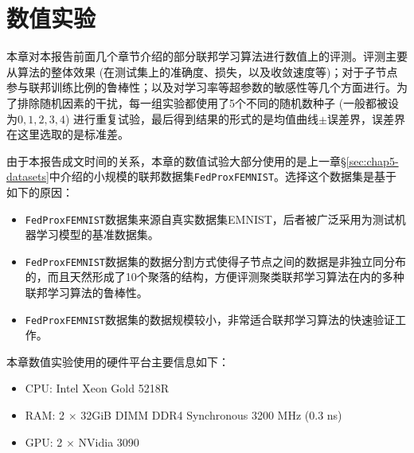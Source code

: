 \chapter{\texorpdfstring{\hspace{-1mm}\bf 数值实验}{数值实验}}
\label{chap6}


本章对本报告前面几个章节介绍的部分联邦学习算法进行数值上的评测。评测主要从算法的整体效果 (在测试集上的准确度、损失，以及收敛速度等)；对于子节点参与联邦训练比例的鲁棒性；以及对学习率等超参数的敏感性等几个方面进行。为了排除随机因素的干扰，每一组实验都使用了5个不同的随机数种子 (一般都被设为$0, 1, 2, 3, 4$) 进行重复试验，最后得到结果的形式的是均值曲线$\pm$误差界，误差界在这里选取的是标准差。

由于本报告成文时间的关系，本章的数值试验大部分使用的是上一章\S\ref{sec:chap5-datasets}中介绍的小规模的联邦数据集\texttt{FedProxFEMNIST}。选择这个数据集是基于如下的原因：
\begin{itemize}
    \item \texttt{FedProxFEMNIST}数据集来源自真实数据集EMNIST\cite{cohen2017emnist}，后者被广泛采用为测试机器学习模型的基准数据集。
    \item \texttt{FedProxFEMNIST}数据集的数据分割方式使得子节点之间的数据是非独立同分布的，而且天然形成了10个聚落的结构，方便评测聚类联邦学习算法\cite{Ghosh_2022_cfl, Sattler_2021_cfl}在内的多种联邦学习算法的鲁棒性。
    \item \texttt{FedProxFEMNIST}数据集的数据规模较小，非常适合联邦学习算法的快速验证工作。
\end{itemize}

本章数值实验使用的硬件平台主要信息如下：
\begin{itemize}
    \item CPU: Intel{\textsuperscript{\tiny\textregistered}} Xeon{\textsuperscript{\tiny\textregistered}} Gold 5218R
    \item RAM: 2 $\times$ 32GiB DIMM DDR4 Synchronous 3200 MHz (0.3 ns)
    \item GPU: 2 $\times$ NVidia{\textsuperscript{\tiny\textregistered}} 3090
\end{itemize}







